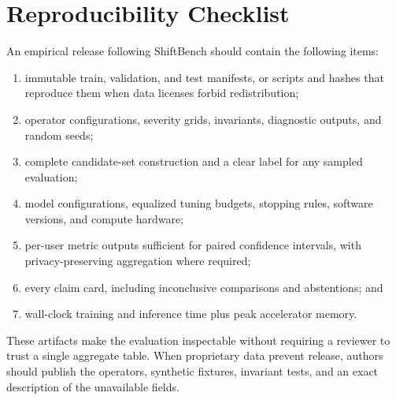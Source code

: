 \section{Reproducibility Checklist}
\label{sec:reproducibility}

An empirical release following ShiftBench should contain the following items:

\begin{enumerate}[leftmargin=*,itemsep=2pt,topsep=3pt]
  \item immutable train, validation, and test manifests, or scripts and hashes
  that reproduce them when data licenses forbid redistribution;
  \item operator configurations, severity grids, invariants, diagnostic outputs,
  and random seeds;
  \item complete candidate-set construction and a clear label for any sampled
  evaluation;
  \item model configurations, equalized tuning budgets, stopping rules, software
  versions, and compute hardware;
  \item per-user metric outputs sufficient for paired confidence intervals, with
  privacy-preserving aggregation where required;
  \item every claim card, including inconclusive comparisons and abstentions; and
  \item wall-clock training and inference time plus peak accelerator memory.
\end{enumerate}

These artifacts make the evaluation inspectable without requiring a reviewer to
trust a single aggregate table.  When proprietary data prevent release, authors
should publish the operators, synthetic fixtures, invariant tests, and an exact
description of the unavailable fields.
